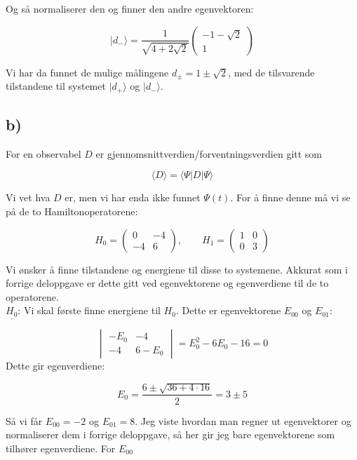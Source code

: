 \documentclass[a4paper,norsk, 10pt]{article}
\numberwithin{equation}{section}
\begin{document}
Og så normaliserer den og finner den andre egenvektoren:

\begin{equation}
|d_-\rangle = \frac{1}{\sqrt{4+2\sqrt{2}}}
\begin{pmatrix}
-1 - \sqrt{2}\\
1
\end{pmatrix}
\label{eq:d-}
\end{equation}

Vi har da funnet de mulige målingene $d_{\pm} = 1 \pm \sqrt{2}$, med de tilsvarende tilstandene til systemet $|d_+\rangle$ og $|d_-\rangle$.

\subsection*{b)}

For en observabel $D$ er gjennomsnittverdien/forventningsverdien gitt som

$$
\langle D\rangle = \langle\Psi | D | \Psi \rangle
$$

Vi vet hva $D$ er, men vi har enda ikke funnet $\Psi(t)$. For å finne denne må vi se på de to Hamiltonoperatorene:

$$
H_0 = 
\begin{pmatrix}
0 & -4\\
-4 & 6
\end{pmatrix}
, \qquad
H_1 = 
\begin{pmatrix}
1 & 0\\
0 & 3
\end{pmatrix}
$$

Vi ønsker å finne tilstandene og energiene til disse to systemene. Akkurat som i forrige deloppgave er dette gitt ved egenvektorene og egenverdiene til de to operatorene. \\

\textbf{$\underline{H_0}$}: Vi skal første finne energiene til $H_0$. Dette er egenvektorene $E_{00}$ og $E_{01}$:

$$
\begin{vmatrix}
-E_0 & -4\\
-4 & 6-E_0
\end{vmatrix}
= E_0^2 -6E_0 - 16 = 0
$$
Dette gir egenverdiene:

$$
E_0 = \frac{6 \pm \sqrt{36 + 4\cdot 16}}{2} = 3\pm 5
$$

Så vi får $E_{00} = -2$ og $E_{01} = 8$. Jeg viste hvordan man regner ut egenvektorer og normaliserer dem i forrige deloppgave, så her gir jeg bare egenvektorene som tilhører egenverdiene. For $E_{00}$
\end{document}
